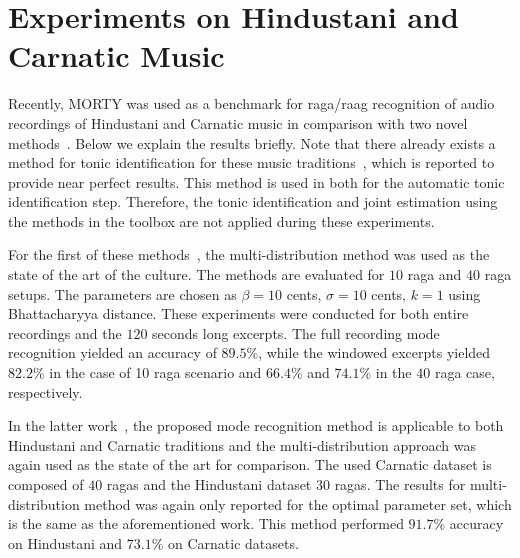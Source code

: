 \documentclass{sig-alternate}
\begin{document}
\section{Experiments on Hindustani and Carnatic Music}
\label{sec:hindustani_carnatic}

Recently, MORTY was used as a benchmark for raga/raag recognition of audio recordings of Hindustani and Carnatic music in comparison with two novel methods~\cite{gulati2016raga,gulati_network}. Below we explain the results briefly. Note that there already exists a method for tonic identification for these music traditions~\cite{sankalp_tonic}, which is reported to provide near perfect results. This method is used in both for the automatic tonic identification step. Therefore, the tonic identification and joint estimation using the methods in the toolbox are not applied during these experiments.

For the first of these methods~\cite{gulati2016raga}, the multi-distribution method was used as the state of the art of the culture. The methods are evaluated for $10$ raga and $40$ raga setups. The parameters are chosen as $\beta = 10$ cents, $\sigma = 10$ cents, $k = 1$ using Bhattacharyya distance. These experiments were conducted for both entire recordings and the $120$ seconds long excerpts. The full recording mode recognition yielded an accuracy of $89.5\%$, while the windowed excerpts yielded $82.2\%$ in the case of 10 raga scenario and $66.4\%$ and $74.1\%$ in the $40$ raga case, respectively.

In the latter work~\cite{gulati_network}, the proposed mode recognition method is applicable to both Hindustani and Carnatic traditions and the multi-distribution approach was again used as the state of the art for comparison. The used Carnatic dataset is composed of $40$ ragas and the Hindustani dataset $30$ ragas. The results for multi-distribution method was again only reported for the optimal parameter set, which is the same as the aforementioned work. This method performed $91.7\%$ accuracy on Hindustani and $73.1\%$ on Carnatic datasets.
\end{document}
